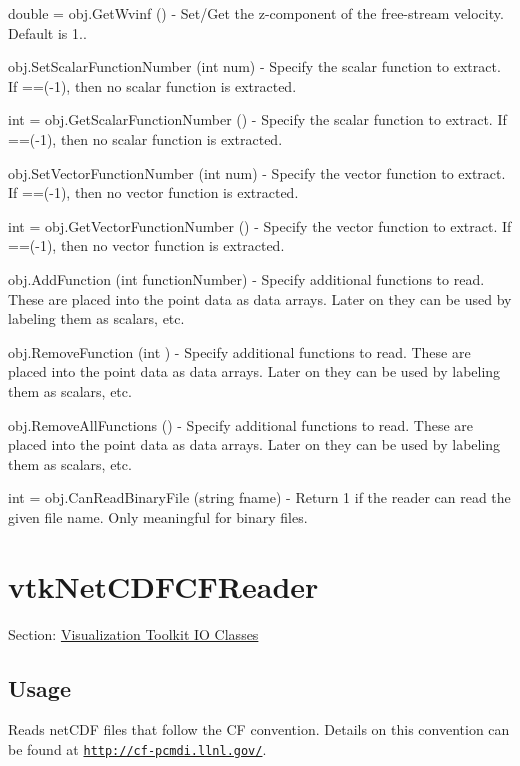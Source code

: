 \begin{DoxyItemize}
\item {\ttfamily double = obj.\-Get\-Wvinf ()} -\/ Set/\-Get the z-\/component of the free-\/stream velocity. Default is 1..  
\item {\ttfamily obj.\-Set\-Scalar\-Function\-Number (int num)} -\/ Specify the scalar function to extract. If ==(-\/1), then no scalar function is extracted.  
\item {\ttfamily int = obj.\-Get\-Scalar\-Function\-Number ()} -\/ Specify the scalar function to extract. If ==(-\/1), then no scalar function is extracted.  
\item {\ttfamily obj.\-Set\-Vector\-Function\-Number (int num)} -\/ Specify the vector function to extract. If ==(-\/1), then no vector function is extracted.  
\item {\ttfamily int = obj.\-Get\-Vector\-Function\-Number ()} -\/ Specify the vector function to extract. If ==(-\/1), then no vector function is extracted.  
\item {\ttfamily obj.\-Add\-Function (int function\-Number)} -\/ Specify additional functions to read. These are placed into the point data as data arrays. Later on they can be used by labeling them as scalars, etc.  
\item {\ttfamily obj.\-Remove\-Function (int )} -\/ Specify additional functions to read. These are placed into the point data as data arrays. Later on they can be used by labeling them as scalars, etc.  
\item {\ttfamily obj.\-Remove\-All\-Functions ()} -\/ Specify additional functions to read. These are placed into the point data as data arrays. Later on they can be used by labeling them as scalars, etc.  
\item {\ttfamily int = obj.\-Can\-Read\-Binary\-File (string fname)} -\/ Return 1 if the reader can read the given file name. Only meaningful for binary files.  
\end{DoxyItemize}\hypertarget{vtkio_vtknetcdfcfreader}{}\section{vtk\-Net\-C\-D\-F\-C\-F\-Reader}\label{vtkio_vtknetcdfcfreader}
Section\-: \hyperlink{sec_vtkio}{Visualization Toolkit I\-O Classes} \hypertarget{vtkwidgets_vtkxyplotwidget_Usage}{}\subsection{Usage}\label{vtkwidgets_vtkxyplotwidget_Usage}
Reads net\-C\-D\-F files that follow the C\-F convention. Details on this convention can be found at \href{http://cf-pcmdi.llnl.gov/}{\tt http\-://cf-\/pcmdi.\-llnl.\-gov/}.

